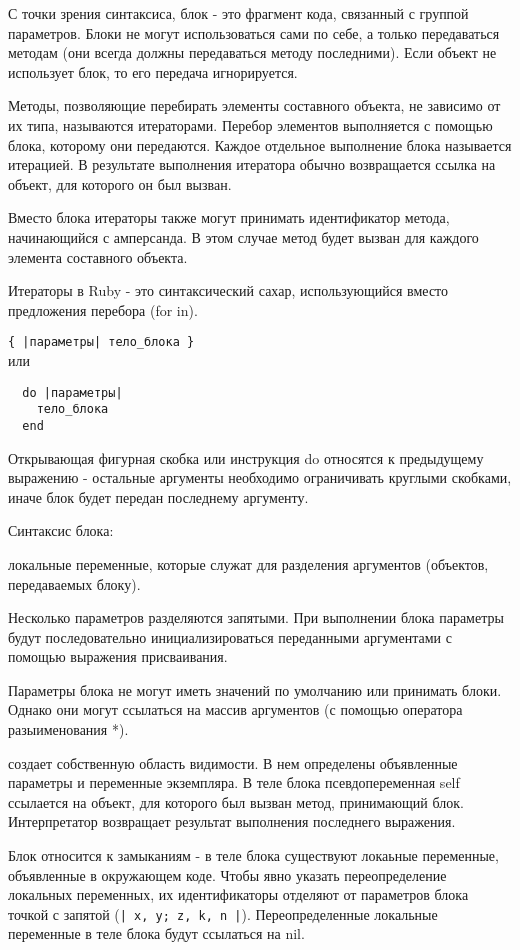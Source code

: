 С точки зрения синтаксиса, блок - это фрагмент кода, связанный с группой параметров. Блоки не могут использоваться сами по себе, а только передаваться методам (они всегда должны передаваться методу последними). Если объект не использует блок, то его передача игнорируется.
\begin{note}
  Методы, позволяющие перебирать элементы составного объекта, не зависимо от их типа, называются итераторами. Перебор элементов выполняется с помощью блока, которому они передаются. Каждое отдельное выполнение блока называется итерацией. В результате выполнения итератора обычно возвращается ссылка на объект, для которого он был вызван.

  Вместо блока итераторы также могут принимать идентификатор метода, начинающийся с амперсанда. В этом случае метод будет вызван для каждого элемента составного объекта.

  Итераторы в Ruby - это синтаксический сахар, использующийся вместо предложения перебора (for in). 
\end{note}
\verb!{ |параметры| тело_блока }!
\\ или
\begin{verbatim}
  do |параметры|
    тело_блока
  end
\end{verbatim}

Открывающая фигурная скобка или инструкция do относятся к предыдущему выражению - остальные аргументы необходимо ограничивать круглыми скобками, иначе блок будет передан последнему аргументу.

\begin{keylist}{Синтаксис блока:}

   локальные переменные, которые служат для разделения аргументов (объектов, передаваемых блоку).

  Несколько параметров разделяются запятыми. При выполнении блока параметры будут последовательно инициализироваться переданными аргументами с помощью выражения присваивания.

  Параметры блока не могут иметь значений по умолчанию или принимать блоки. Однако они могут ссылаться на массив аргументов (с помощью оператора разыименования *).
  
   создает собственную область видимости. В нем определены объявленные параметры и переменные экземпляра. В теле блока псевдопеременная self ссылается на объект, для которого был вызван метод, принимающий блок. Интерпретатор возвращает результат выполнения последнего выражения.

  Блок относится к замыканиям - в теле блока существуют локаьные переменные, объявленные в окружающем коде. Чтобы явно указать переопределение локальных переменных, их идентификаторы отделяют от параметров блока точкой с запятой (\verb!| x, y; z, k, n |!). Переопределенные локальные переменные в теле блока будут ссылаться на nil.
\end{keylist}

